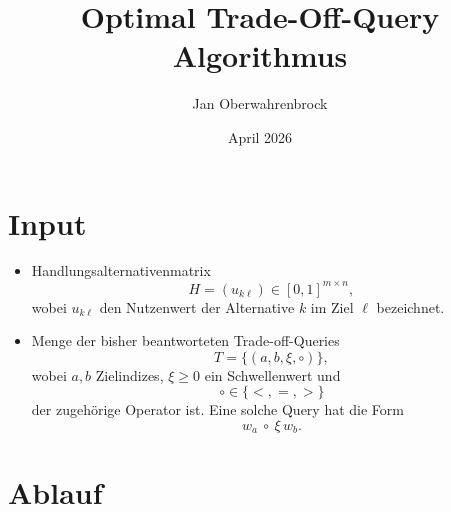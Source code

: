 \documentclass{article}
\title{Optimal Trade-Off-Query Algorithmus}
\author{Jan Oberwahrenbrock}
\date{April 2026}
\begin{document}
\maketitle

\section*{Input}

\begin{itemize}
\item
Handlungsalternativenmatrix
\[
H=(u_{k\ell}) \in [0,1]^{m\times n},
\]
wobei \(u_{k\ell}\) den Nutzenwert der Alternative \(k\) im Ziel \(\ell\)
bezeichnet.

\item
Menge der bisher beantworteten Trade-off-Queries
\[
T=\{(a,b,\xi,\circ)\},
\]
wobei \(a,b\) Zielindizes, \(\xi\ge 0\) ein Schwellenwert und
\[
\circ \in \{<,=,>\}
\]
der zugeh\"orige Operator ist. Eine solche Query hat die Form
\[
w_a \ \circ \ \xi\, w_b.
\]
\end{itemize}


\section*{Ablauf}
\end{document}
